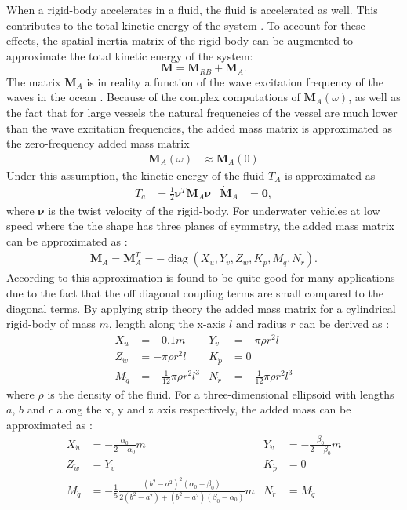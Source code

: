 When a rigid-body accelerates in a fluid, the fluid is accelerated as well. 
This contributes to the total kinetic energy of the system \cite{antonelli2018}.
To account for these effects, the spatial inertia matrix of the rigid-body
can be augmented to approximate the total kinetic energy of the system: 
\begin{equation}
    \bm{M} = \bm{M}_{RB} + \bm{M}_{A}.
\end{equation}
The matrix $\bm{M}_A$ is in reality a function of the wave excitation frequency
of the waves in the ocean \cite{fossen2021}. Because of the complex computations
of $\bm{M}_A(\omega)$, as well as the fact that for large vessels the natural
frequencies of the vessel are much lower than the wave excitation frequencies,
the added mass matrix is approximated as the zero-frequency added mass matrix
\begin{align}
    \bm{M}_A(\omega) &\approx \bm{M}_A(0)
\end{align}
Under this assumption, the kinetic energy of the fluid $T_A$ is approximated
as
\begin{align}
    T_a &= \frac{1}{2}\bm{\nu}^T\bm{M}_A\bm{\nu} & \dot{\bm{M}}_A &= \bm{0},
\end{align}
where $\bm{\nu}$ is the twist velocity of the rigid-body. For underwater 
vehicles at low speed where the the shape has three planes of symmetry, the
added mass matrix can be approximated as \cite{fossen2021}:
\begin{align}
    \bm{M}_A = \bm{M}_A^T =
    -\operatorname{diag}(X_{\dot{u}}, Y_{\dot{v}}, Z_{\dot{w}},
        K_{\dot{p}}, M_{\dot{q}}, N_{\dot{r}}).
\end{align}
According to \cite{fossen2021} this approximation is found to be quite good for
many applications due to the fact that the off diagonal coupling terms are small
compared to the diagonal terms. By applying strip theory the added mass matrix for a cylindrical rigid-body of
mass $m$, length along the x-axis $l$ and radius $r$ can be derived as \cite{fossen1994}:
\begin{align}
 X_{\dot{u}} &= -0.1 m &
 Y_{\dot{v}} &= -\pi \rho r^2 l \nonumber \\
 Z_{\dot{w}} &= -\pi \rho r^2 l &
 K_{\dot{p}} &= 0 \\
 M_{\dot{q}} &= -\frac{1}{12} \pi \rho r^2 l^3 &
 N_{\dot{r}} &= -\frac{1}{12} \pi \rho r^2 l^3 \nonumber
\end{align}
where $\rho$ is the density of the fluid. For a three-dimensional ellipsoid with
lengths $a$, $b$ and $c$ along the x, y and z axis respectively, the added mass
can be approximated as \cite{fossen2021}:
\begin{align}
 X_{\dot{u}} &= -\frac{\alpha_0}{2-\alpha_0}m &
 Y_{\dot{v}} &= -\frac{\beta_0}{2-\beta_0}m \nonumber \\
 Z_{\dot{w}} &= Y_{\dot{v}}&
 K_{\dot{p}} &= 0 \label{eq:ellipsoid_added_mass} \\
 M_{\dot{q}} &= -\frac{1}{5}\frac{(b^2-a^2)^2(\alpha_0-\beta_0)}{2(b^2-a^2) + (b^2+a^2)(\beta_0-\alpha_0)}m&
 N_{\dot{r}} &= M_{\dot{q}} \nonumber
\end{align}

